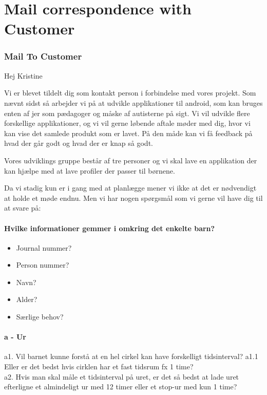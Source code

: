 \chapter{Mail correspondence with Customer}
\label{sec:customerReq}
\subsection{Mail To Customer}
Hej Kristine

Vi er blevet tildelt dig som kontakt person i forbindelse med vores projekt. Som n\ae{}vnt sidst s\aa{} arbejder vi p\aa{} at udvikle applikationer til android, som kan bruges enten af jer som p\ae{}dagoger og m\aa{}ske af autisterne p\aa{} sigt. Vi vil udvikle flere forskellige applikationer, og vi vil gerne l\o{}bende aftale m\o{}der med dig, hvor vi kan vise det samlede produkt som er lavet. P\aa{} den m\aa{}de kan vi f\aa{} feedback p\aa{} hvad der g\aa{}r godt og hvad der er knap s\aa{} godt.

Vores udviklings gruppe best\aa{}r af tre personer og vi skal lave en applikation der kan hj\ae{}lpe med at lave profiler der passer til b\o{}rnene. 

Da vi stadig kun er i gang med at planl\ae{}gge mener vi ikke at det er n\o{}dvendigt at holde et m\o{}de endnu. Men vi har nogen sp\o{}rgsm\aa{}l som vi gerne vil have dig til at svare p\aa{}:

\subsubsection{Hvilke informationer gemmer i omkring det enkelte barn?}
\begin{itemize}
	\item Journal nummer?
	\item Person nummer?
	\item Navn?
	\item Alder?
	\item S\ae{}rlige behov?
\end{itemize}

\subsubsection{a - Ur}
a1. Vil barnet kunne forst\aa{} at en hel cirkel kan have forskelligt tidsinterval?
a1.1 Eller er det bedst hvis cirklen har et fast tidsrum fx 1 time?
\\
a2. Hvis man skal m\aa{}le et tidsinterval p\aa{} uret, er det s\aa{} bedst at lade uret efterligne et almindeligt ur med 12 timer eller et stop-ur med kun 1 time?

